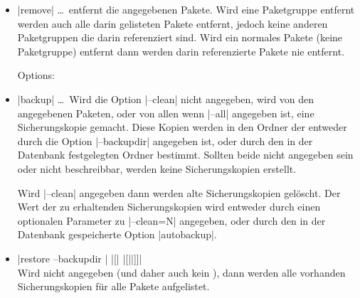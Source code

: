 \begin{itemize}
\item |remove| \ldots\ 
  entfernt die angegebenen Pakete. Wird eine Paketgruppe entfernt
  werden auch alle darin gelisteten Pakete entfernt, jedoch keine
  anderen Paketgruppen die darin referenziert sind. 
  Wird ein normales Pakete (keine Paketgruppe) entfernt dann werden
  darin referenzierte Pakete nie entfernt.

  Options:
\item |backup| \ldots\
  Wird die Option |--clean| nicht angegeben, wird von den angegebenen
  Paketen, oder von allen wenn |--all| angegeben ist, eine 
  Sicherungskopie gemacht. Diese Kopien werden in den Ordner der
  entweder durch die Option |--backupdir| angegeben ist, oder durch
  den in der Datenbank festgelegten Ordner bestimmt. Sollten beide
  nicht angegeben sein oder nicht beschreibbar, werden keine 
  Sicherungskopien erstellt.

  Wird |--clean| angegeben dann werden alte Sicherungskopien gelöscht.
  Der Wert der zu erhaltenden Sicherungskopien wird entweder durch
  einen optionalen Parameter zu |--clean=N| angegeben, oder durch den
  in der Datenbank gespeicherte Option |autobackup|.

\item |restore --backupdir | |[| |[||]]|\\
  Wird  nicht angegeben (und daher auch kein ), dann
  werden alle vorhanden Sicherungskopien für alle Pakete aufgelistet.
 

\end{itemize}
